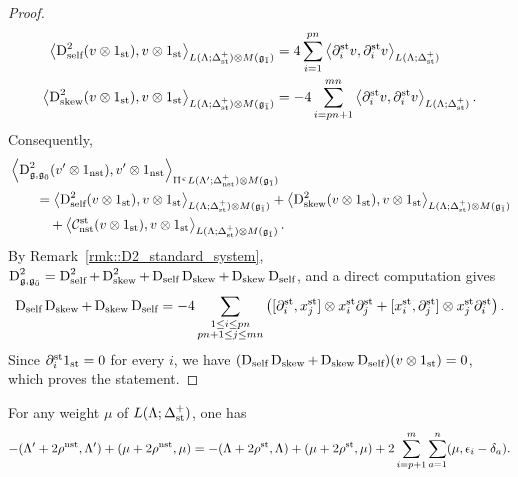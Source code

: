 \begin{proof}
\begin{equation*}
\begin{aligned}
\left\langle
\operatorname{D}_{{\text{self}}}^{2}(v\otimes1_{{\text{st}}}),
v\otimes1_{{\text{st}}}
\right\rangle_
{L(\Lambda;\Delta_{{\text{st}}}^{+})\otimes M({\mathfrak{g}_{\bar{1}}})}
&=
4\sum_{i=1}^{pn}
\left\langle
\partial_i^{{\text{st}}}v,\partial_i^{{\text{st}}}v
\right\rangle_
{L(\Lambda;\Delta_{{\text{st}}}^{+})}\\
\left\langle
\operatorname{D}_{{\text{skew}}}^{2}(v\otimes1_{{\text{st}}}),
v\otimes1_{{\text{st}}}
\right\rangle_
{L(\Lambda;\Delta_{{\text{st}}}^{+})\otimes M({\mathfrak{g}_{\bar{1}}})}
&=
-4\sum_{i=pn+1}^{mn}
\left\langle
\partial_i^{{\text{st}}}v,\partial_i^{{\text{st}}}v
\right\rangle_
{L(\Lambda;\Delta_{{\text{st}}}^{+})}.
\end{aligned}
\end{equation*}
Consequently,
\begin{equation*}
\begin{aligned}
&
\left\langle
\operatorname{D}_{{\mathfrak{g}},{\mathfrak{g}_{\bar{0}}}}^{2}(v'\otimes1_{{\text{nst}}}),
v'\otimes1_{{\text{nst}}}
\right\rangle_
{ \Uppi^{\upepsilon}L(\Lambda';\Delta_{{\text{nst}}}^{+})\otimes M({\mathfrak{g}_{\bar{1}}})}
\\
&\qquad=
\left\langle
\operatorname{D}_{{\text{self}}}^{2}(v\otimes1_{{\text{st}}}),
v\otimes1_{{\text{st}}}
\right\rangle_
{L(\Lambda;\Delta_{{\text{st}}}^{+})\otimes M({\mathfrak{g}_{\bar{1}}})}
+
\left\langle
\operatorname{D}_{{\text{skew}}}^{2}(v\otimes1_{{\text{st}}}),
v\otimes1_{{\text{st}}}
\right\rangle_
{L(\Lambda;\Delta_{{\text{st}}}^{+})\otimes M({\mathfrak{g}_{\bar{1}}})}
\\
&\qquad\quad+
\left\langle
\mathcal C_{{\text{nst}}}^{{\text{st}}}(v\otimes1_{{\text{st}}}),
v\otimes1_{{\text{st}}}
\right\rangle_
{L(\Lambda;\Delta_{{\text{st}}}^{+})\otimes M({\mathfrak{g}_{\bar{1}}})}.
\end{aligned}
\end{equation*}
By Remark~\ref{rmk::D2_standard_system}, $
\operatorname{D}_{{\mathfrak{g}},{\mathfrak{g}_{\bar{0}}}}^{2}
=
\operatorname{D}_{{\text{self}}}^{2}
+
\operatorname{D}_{{\text{skew}}}^{2}
+
\operatorname{D}_{{\text{self}}}\operatorname{D}_{{\text{skew}}}
+
\operatorname{D}_{{\text{skew}}}\operatorname{D}_{{\text{self}}}$, and a direct computation gives
\begin{equation*}
\operatorname{D}_{{\text{self}}}\operatorname{D}_{{\text{skew}}}
+
\operatorname{D}_{{\text{skew}}}\operatorname{D}_{{\text{self}}}
=
-4
\sum_{\substack{1\leq i\leq pn\\ pn+1\leq j\leq mn}}
\left(
[\partial_i^{{\text{st}}},x_j^{{\text{st}}}]\otimes x_i^{{\text{st}}}\partial_j^{{\text{st}}}
+
[x_i^{{\text{st}}},\partial_j^{{\text{st}}}]\otimes x_j^{{\text{st}}}\partial_i^{{\text{st}}}
\right).
\end{equation*}
Since $\partial_i^{{\text{st}}}1_{{\text{st}}}=0$ for every $i$, we have $(\operatorname{D}_{{\text{self}}}\operatorname{D}_{{\text{skew}}}+\operatorname{D}_{{\text{skew}}}\operatorname{D}_{{\text{self}}})(v\otimes1_{{\text{st}}})=0$, which proves the statement.
\end{proof}

\begin{lemma}\label{lemm:transport_Dirac_inequality} For any weight $\mu$ of $L(\Lambda;\Delta_{{\text{st}}}^{+})$, one has 
\[
 -(\Lambda'+2\rho^{{\text{nst}}},\Lambda')+(\mu+2\rho^{{\text{nst}}},\mu)= -(\Lambda+2\rho^{{\text{st}}},\Lambda)+(\mu+2\rho^{{\text{st}}},\mu)+2\sum_{i=p+1}^{m}\sum_{a=1}^{n}(\mu,\epsilon_{i}-\delta_{a}).
 \]
\end{lemma}

